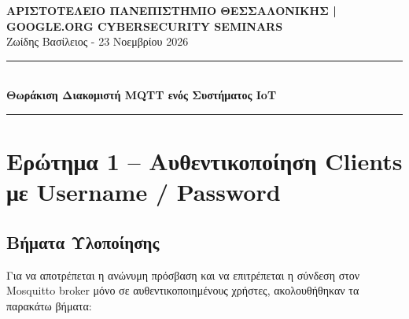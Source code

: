 \documentclass[11pt, a4paper]{article}
\begin{document}
\begin{center}
    {\small\bfseries\color{accent} ΑΡΙΣΤΟΤΕΛΕΙΟ ΠΑΝΕΠΙΣΤΗΜΙΟ ΘΕΣΣΑΛΟΝΙΚΗΣ | GOOGLE.ORG CYBERSECURITY SEMINARS}\\[2pt]
    {\small\color{codecomment} Ζωίδης Βασίλειος - 23 Νοεμβρίου 2026}\\[16pt]
    \rule{\textwidth}{0.5pt}\\[16pt]
    {\LARGE\bfseries\color{primary} Θωράκιση Διακομιστή MQTT ενός Συστήματος IoT}
\end{center}
\rule{\textwidth}{0.5pt}

\tableofcontents
\newpage

\section{Ερώτημα 1 -- Αυθεντικοποίηση Clients με Username / Password}

\subsection{Βήματα Υλοποίησης}
Για να αποτρέπεται η ανώνυμη πρόσβαση και να επιτρέπεται η σύνδεση στον Mosquitto broker μόνο σε αυθεντικοποιημένους χρήστες, ακολουθήθηκαν τα παρακάτω βήματα:
\end{document}
